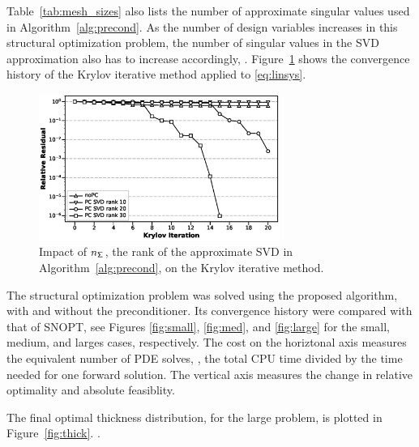 Table~\ref{tab:mesh_sizes} also lists the number of approximate singular values
used in Algorithm~\ref{alg:precond}.  As the number of design variables
increases in this structural optimization problem, the number of singular values
in the SVD approximation also has to increase accordingly, .
Figure~\ref{fig:svdrank} shows the convergence history of the Krylov iterative
method applied to \eqref{eq:linsys}.  


\begin{figure}[tbp]
  \centering
  \includegraphics[width=0.7\textwidth]{./figs/newres2/SVD_Ranks.eps}
  \caption{Impact of $n_{\mathsf{\Sigma}}$, the rank of the approximate SVD in
    Algorithm~\ref{alg:precond}, on the Krylov iterative method.
  \label{fig:svdrank}}
\end{figure}

The structural optimization problem was solved using the proposed algorithm,
with and without the preconditioner. Its convergence history were compared with 
that of SNOPT, see Figures \ref{fig:small}, \ref{fig:med}, and \ref{fig:large} for the 
small, medium, and larges cases, respectively. The cost on the horiztonal axis 
measures the equivalent number of PDE solves, 
\ie, the total CPU time divided by the time needed for one
forward solution.  The vertical axis measures the change in relative optimality and
absolute feasiblity.    
  
The final optimal thickness distribution, for the large problem, is plotted in
Figure~\ref{fig:thick}. . 
  
